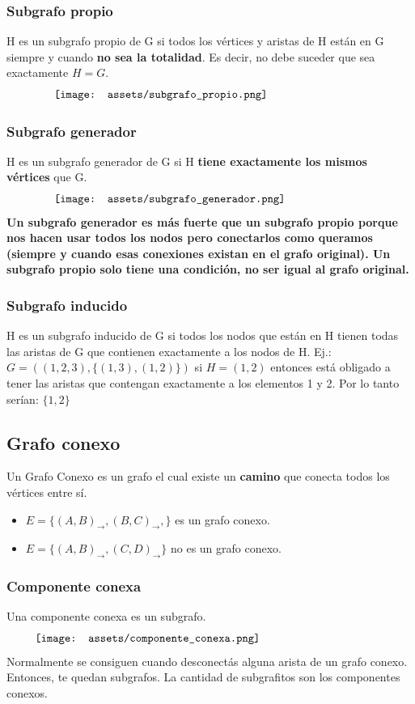 \documentclass[10pt,a4paper]{article}
\begin{document}
\subsubsection*{Subgrafo propio}
H es un subgrafo propio de G si todos los vértices y aristas de H están en G siempre y cuando \textbf{no sea la totalidad}. Es decir, no debe suceder que sea exactamente $H = G$.
\[\begin{minipage}[b]{0.8\textwidth}
    \texttt{[image: assets/subgrafo\_propio.png]}
\end{minipage}\]
\subsubsection*{Subgrafo generador}
H es un subgrafo generador de G si H \textbf{tiene exactamente los mismos vértices} que G. 
\[\begin{minipage}[b]{0.8\textwidth}
    \texttt{[image: assets/subgrafo\_generador.png]}
\end{minipage}\]
\textbf{Un subgrafo generador es más fuerte que un subgrafo propio porque nos hacen usar todos los nodos pero conectarlos como queramos (siempre y cuando esas conexiones existan en el grafo original). Un subgrafo propio solo tiene una condición, no ser igual al grafo original.}
\subsubsection*{Subgrafo inducido}
H es un subgrafo inducido de G si todos los nodos que están en H tienen todas las aristas de G que contienen exactamente a los nodos de H. 
Ej.: $G = ((1, 2, 3), \{(1,3), (1,2)\})$ si $H = (1,2)$ entonces está obligado a tener las aristas que contengan exactamente a los elementos 1 y 2. Por lo tanto serían: $\{1, 2\}$ 
\subsection*{Grafo conexo}
Un Grafo Conexo es un grafo el cual existe un \textbf{camino} que conecta todos los vértices entre sí. 
\begin{itemize}
    \item $E = \{(A,B)_{\rightarrow}, (B, C)_{\rightarrow}, \}$ es un grafo conexo.
    \item $E = \{(A, B)_{\rightarrow}, (C, D)_{\rightarrow}\}$ no es un grafo conexo.
\end{itemize}
\subsubsection*{Componente conexa}
Una componente conexa es un subgrafo.
\[\begin{minipage}[b]{0.9\textwidth}
    \texttt{[image: assets/componente\_conexa.png]}
\end{minipage}\]
Normalmente se consiguen cuando desconectás alguna arista de un grafo conexo. Entonces, te quedan subgrafos. La cantidad de subgrafitos son los componentes conexos.
\end{document}
